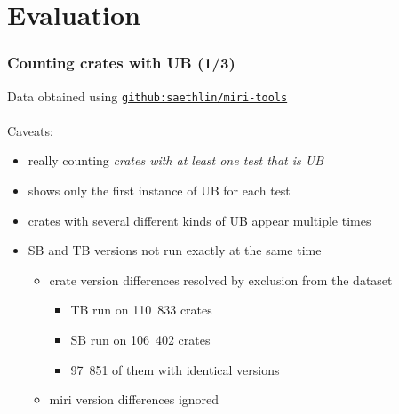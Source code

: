 \section{Evaluation}

\begin{frame}
    \frametitle{Counting crates with UB (1/3)}
    Data obtained using \href{https://github.com/saethlin/miri-tools}{\texttt{github:saethlin/miri-tools}}\\~\\

    Caveats:
    \begin{itemize}
        \item really counting \textit{crates with at least one test that is UB}
        \item shows only the first instance of UB for each test
        \item crates with several different kinds of UB appear multiple times
        \item SB and TB versions not run exactly at the same time
            \begin{itemize}
                \item crate version differences resolved by exclusion from the dataset
                    \begin{itemize}
                        \item TB run on 110~833 crates
                        \item SB run on 106~402 crates
                        \item 97~851 of them with identical versions
                    \end{itemize}
                \item miri version differences ignored
            \end{itemize}
    \end{itemize}
\end{frame}

